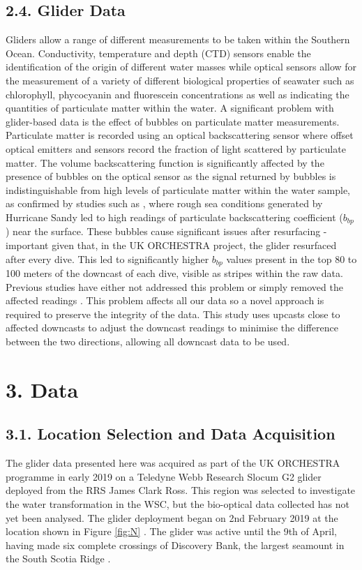 \documentclass[
	a4paper, %
	10pt, %
	unnumberedsections, %
	twoside, %
]{LTJournalArticle}
\begin{document}
\begin{multicols}{2}
\subsection{2.4. Glider Data}
Gliders allow a range of different measurements to be taken within the Southern Ocean. Conductivity, temperature and depth (CTD)
sensors enable the identification of the origin of different water masses \citep{ref2} while optical sensors allow for the
measurement of a variety of different biological properties of seawater such as chlorophyll, phycocyanin and fluorescein
concentrations as well as indicating the quantities of particulate matter within the water. A significant problem with glider-based
data is the effect of bubbles on particulate matter measurements. Particulate matter is recorded using an optical backscattering
sensor where offset optical emitters and sensors record the fraction of light scattered by particulate matter. The volume
backscattering function is significantly affected by the presence of bubbles on the optical sensor as the signal returned by
bubbles is indistinguishable from high levels of particulate matter within the water sample, as confirmed by studies such as
\citet{ref40}, where rough sea conditions generated by Hurricane Sandy led to high readings of particulate backscattering
coefficient ($b_{bp}$) near the surface. These bubbles cause significant issues after resurfacing - important given that, in the UK
ORCHESTRA project, the glider resurfaced after every dive. This led to significantly higher $b_{bp}$ values present in the top 80 to
100 meters of the downcast of each dive, visible as stripes within the raw data. Previous studies have either not addressed this
problem \citep{ref39} or simply removed the affected readings \citep{ref37, ref38, ref41}. This problem affects all our data so a
novel approach is required to preserve the integrity of the data. This study uses upcasts close to affected
downcasts to adjust the downcast readings to minimise the difference between the two directions, allowing all downcast data to be
used.

\section{3. Data}
\subsection{3.1. Location Selection and Data Acquisition}

The glider data presented here was acquired as part of the UK ORCHESTRA programme in early 2019 on a Teledyne Webb Research Slocum
G2 glider deployed from the RRS James Clark Ross. This region was selected to investigate the water transformation in the WSC, but
the bio-optical data collected has not yet been analysed. The glider deployment began on 2nd February 2019 at the location shown in
Figure \ref{fig:N} . The glider was active until the 9th of April, having made six complete crossings of Discovery Bank, the
largest seamount in the South Scotia Ridge \citep{ref2}.\\


\end{multicols}
\end{document}
